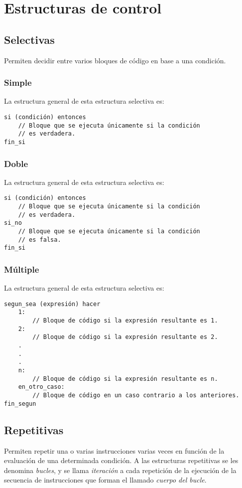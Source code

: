 \documentclass{article}
\begin{document}
\section{Estructuras de control}
\subsection{Selectivas}
Permiten decidir entre varios bloques de código en base a una condición.
\subsubsection{Simple}
La estructura general de esta estructura selectiva es:
\begin{lstlisting}[language = pseudocodigoesp]
si (condición) entonces
    // Bloque que se ejecuta únicamente si la condición
    // es verdadera.
fin_si
\end{lstlisting}
\subsubsection{Doble}
La estructura general de esta estructura selectiva es:
\begin{lstlisting}[language = pseudocodigoesp]
si (condición) entonces
    // Bloque que se ejecuta únicamente si la condición
    // es verdadera.
si_no
    // Bloque que se ejecuta únicamente si la condición
    // es falsa.
fin_si
\end{lstlisting}
\subsubsection{Múltiple}
La estructura general de esta estructura selectiva es:
\begin{lstlisting}[language = pseudocodigoesp]
segun_sea (expresión) hacer
    1:
        // Bloque de código si la expresión resultante es 1.
    2:
        // Bloque de código si la expresión resultante es 2.
    .
    .
    .
    n:
        // Bloque de código si la expresión resultante es n.
    en_otro_caso:
        // Bloque de código en un caso contrario a los anteriores.
fin_segun
\end{lstlisting}
\subsection{Repetitivas}
Permiten repetir una o varias instrucciones varias veces en función
de la evaluación de una determinada condición. A las estructuras repetitivas
se les denomina \emph{bucles}, y se llama \emph{iteración} a cada repetición de la
ejecución de la secuencia de instrucciones que forman el llamado
\emph{cuerpo del bucle}. 
\end{document}
